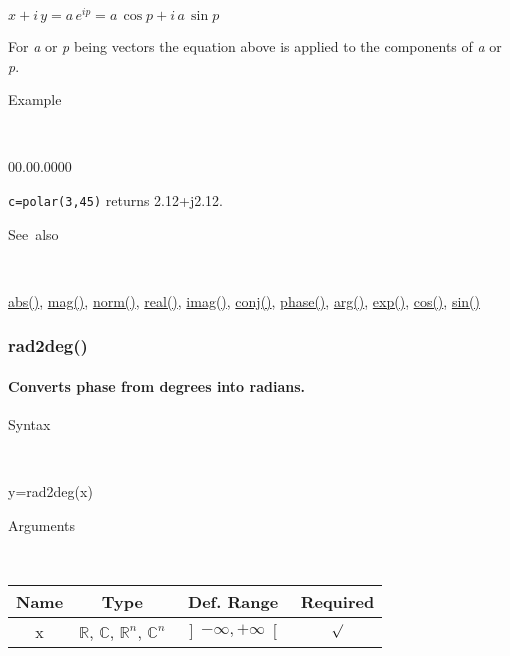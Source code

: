 \medskip{}
$x+i\, y=a\, e^{ip}=a\,\cos p+i\, a\,\sin p$
\medskip{}

For \textit{a} or \textit{p} being vectors the equation
above is applied to the components of \textit{a} or \textit{p}.

\begin{description}
\item [Example]~
\end{description}
\begin{lyxlist}{00.00.0000}
\item [\texttt{c=polar(3,45)}]returns 2.12+j2.12.
\end{lyxlist}
\begin{description}
\item [See~also]~
\end{description}
\textcolor{blue}{\hyperlink{abs}{abs()}}, \textcolor{blue}{\hyperlink{mag}{mag()}},
\textcolor{blue}{\hyperlink{norm}{norm()}}, \textcolor{blue}{\hyperlink{real}{real()}},
\textcolor{blue}{\hyperlink{imag}{imag()}}, \textcolor{blue}{\hyperlink{conj}{conj()}},
\textcolor{blue}{\hyperlink{phase}{phase()}}, \textcolor{blue}{\hyperlink{arg}{arg()}},
\textcolor{blue}{\hyperlink{exp}{exp()}}, \textcolor{blue}{\hyperlink{cos}{cos()}},
\textcolor{blue}{\hyperlink{sin}{sin()}}


\newpage
\subsubsection*{\hypertarget{rad2deg}{}{\Large rad2deg()}}


\paragraph{\label{par:rad2deg}Converts phase from degrees into radians.}

\begin{description}
\item [Syntax]~
\end{description}
y=rad2deg(x)

\begin{description}
\item [Arguments]~
\end{description}
\begin{tabular}{|c|c|c|c|}
\hline 
Name&
Type&
Def. Range&
Required\tabularnewline
\hline
\hline 
x&
$\mathbb{R}$, $\mathbb{C}$, $\mathbb{R}^{n}$, $\mathbb{C}^{n}$ &
$\left]-\infty,+\infty\right[$&
$\surd$\tabularnewline
\hline
\end{tabular}

